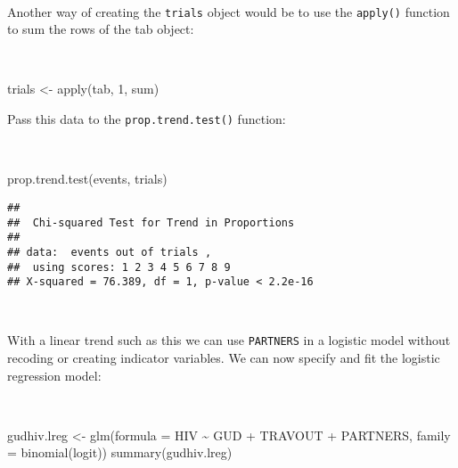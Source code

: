 \documentclass[
  12pt,
  a4paper]{book}
\newenvironment{Shaded}{\begin{snugshade}}{\end{snugshade}}
\newcommand{\AttributeTok}[1]{\textcolor[rgb]{0.77,0.63,0.00}{#1}}
\newcommand{\DecValTok}[1]{\textcolor[rgb]{0.00,0.00,0.81}{#1}}
\newcommand{\FunctionTok}[1]{\textcolor[rgb]{0.00,0.00,0.00}{#1}}
\newcommand{\NormalTok}[1]{#1}
\newcommand{\OtherTok}[1]{\textcolor[rgb]{0.56,0.35,0.01}{#1}}
\newcommand{\SpecialCharTok}[1]{\textcolor[rgb]{0.00,0.00,0.00}{#1}}
\begin{document}
~

Another way of creating the \texttt{trials} object would be to use the \texttt{apply()} function to sum the rows of the tab object:

~

\begin{Shaded}
\begin{Highlighting}[]
\NormalTok{trials }\OtherTok{\textless{}{-}} \FunctionTok{apply}\NormalTok{(tab, }\DecValTok{1}\NormalTok{, sum)}
\end{Highlighting}
\end{Shaded}

\newpage

Pass this data to the \texttt{prop.trend.test()} function:

~

\begin{Shaded}
\begin{Highlighting}[]
\FunctionTok{prop.trend.test}\NormalTok{(events, trials)}
\end{Highlighting}
\end{Shaded}

\begin{verbatim}
## 
##  Chi-squared Test for Trend in Proportions
## 
## data:  events out of trials ,
##  using scores: 1 2 3 4 5 6 7 8 9
## X-squared = 76.389, df = 1, p-value < 2.2e-16
\end{verbatim}

~

With a linear trend such as this we can use \texttt{PARTNERS} in a logistic model without recoding or creating indicator variables. We can now specify and fit the logistic regression model:

~

\begin{Shaded}
\begin{Highlighting}[]
\NormalTok{gudhiv.lreg }\OtherTok{\textless{}{-}} \FunctionTok{glm}\NormalTok{(}\AttributeTok{formula =}\NormalTok{ HIV }\SpecialCharTok{\textasciitilde{}}\NormalTok{ GUD }\SpecialCharTok{+}\NormalTok{ TRAVOUT }\SpecialCharTok{+}\NormalTok{ PARTNERS,}
                   \AttributeTok{family =} \FunctionTok{binomial}\NormalTok{(logit))}
\FunctionTok{summary}\NormalTok{(gudhiv.lreg)}
\end{Highlighting}
\end{Shaded}
\end{document}
